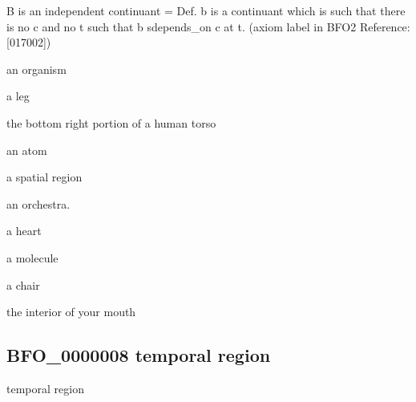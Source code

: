 \documentclass[letterpaper,10pt,english]{sphinxmanual}
\begin{document}
\begin{sphinxShadowBox}

\sphinxAtStartPar
{\hyperref[\detokenize{doc-BFO_0000002::doc}]{}}
\end{sphinxShadowBox}

\begin{sphinxShadowBox}

\sphinxAtStartPar
B is an independent continuant = Def. b is a continuant which is such that there is no c and no t such that b s\sphinxhyphen{}depends\_on c at t. (axiom label in BFO2 Reference: {[}017\sphinxhyphen{}002{]})
\end{sphinxShadowBox}

\begin{sphinxShadowBox}

\sphinxAtStartPar
an organism

\sphinxAtStartPar
a leg

\sphinxAtStartPar
the bottom right portion of a human torso

\sphinxAtStartPar
an atom

\sphinxAtStartPar
a spatial region

\sphinxAtStartPar
an orchestra.

\sphinxAtStartPar
a heart

\sphinxAtStartPar
a molecule

\sphinxAtStartPar
a chair

\sphinxAtStartPar
the interior of your mouth
\end{sphinxShadowBox}

\begin{sphinxShadowBox}

\sphinxAtStartPar
{}
\end{sphinxShadowBox}
\begin{quote}

\ignorespaces \end{quote}


\subsection{BFO\_0000008 \sphinxhyphen{} temporal region}
\label{\detokenize{doc-BFO_0000008:bfo-0000008-temporal-region}}\label{\detokenize{doc-BFO_0000008:index-0}}\label{\detokenize{doc-BFO_0000008::doc}}
\begin{sphinxShadowBox}

\sphinxAtStartPar
temporal region
\end{sphinxShadowBox}
\end{document}
